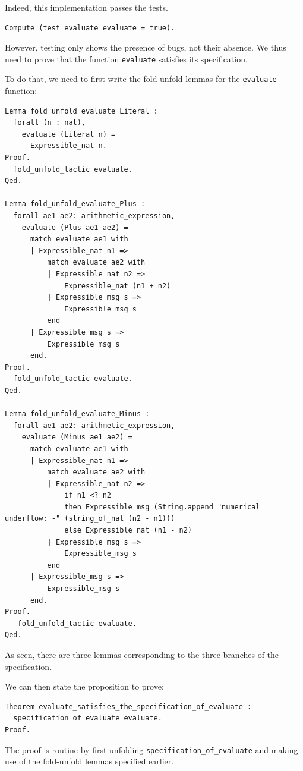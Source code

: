 \documentclass{article}
\begin{document}
Indeed, this implementation passes the tests.

\begin{lstlisting}
Compute (test_evaluate evaluate = true).
\end{lstlisting}

However, testing only shows the presence of bugs, not their absence. We thus need to prove that the function \texttt{evaluate} satisfies its specification. 

To do that, we need to first write the fold-unfold lemmas for the \texttt{evaluate} function:

\begin{lstlisting}
Lemma fold_unfold_evaluate_Literal :
  forall (n : nat),
    evaluate (Literal n) =
      Expressible_nat n.
Proof.
  fold_unfold_tactic evaluate.
Qed.

Lemma fold_unfold_evaluate_Plus :
  forall ae1 ae2: arithmetic_expression,
    evaluate (Plus ae1 ae2) =
      match evaluate ae1 with
      | Expressible_nat n1 =>
          match evaluate ae2 with
          | Expressible_nat n2 =>
              Expressible_nat (n1 + n2)
          | Expressible_msg s =>
              Expressible_msg s
          end
      | Expressible_msg s =>
          Expressible_msg s
      end.
Proof.
  fold_unfold_tactic evaluate.
Qed.

Lemma fold_unfold_evaluate_Minus :
  forall ae1 ae2: arithmetic_expression,
    evaluate (Minus ae1 ae2) = 
      match evaluate ae1 with
      | Expressible_nat n1 =>
          match evaluate ae2 with
          | Expressible_nat n2 =>
              if n1 <? n2
              then Expressible_msg (String.append "numerical underflow: -" (string_of_nat (n2 - n1)))
              else Expressible_nat (n1 - n2)
          | Expressible_msg s =>
              Expressible_msg s
          end
      | Expressible_msg s =>
          Expressible_msg s
      end.
Proof.
   fold_unfold_tactic evaluate.
Qed.
\end{lstlisting}

As seen, there are three lemmas corresponding to the three branches of the specification.

We can then state the proposition to prove:

\begin{lstlisting}
Theorem evaluate_satisfies_the_specification_of_evaluate :
  specification_of_evaluate evaluate.
Proof.
\end{lstlisting}

The proof is routine by first unfolding \texttt{specification\_of\_evaluate} and making use of the fold-unfold lemmas specified earlier. 
\end{document}
